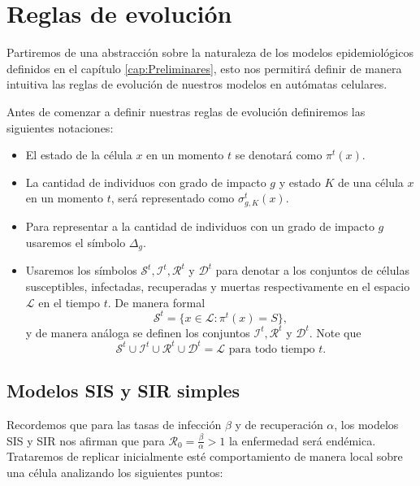 \section{Reglas de evolución}\label{sec:ReglasDeEvolución}

Partiremos de una abstracción sobre la naturaleza de los modelos epidemiológicos definidos en el capítulo \ref{cap:Preliminares}, esto nos permitirá definir de manera intuitiva las reglas de evolución de nuestros modelos en autómatas celulares.

Antes de comenzar a definir nuestras reglas de evolución definiremos las siguientes notaciones:
\begin{itemize}
    \item El estado de la célula $x$ en un momento $t$ se denotará como $\pi^t(x)$.
    \item La cantidad de individuos con grado de impacto $g$ y estado $K$ de una célula $x$ en un momento $t$, será representado como $\sigma_{g,K}^t(x)$.
    \item Para representar a la cantidad de individuos con un grado de impacto $g$ usaremos el símbolo $\Delta_g$. 
    \item Usaremos los símbolos $\mathcal{S}^t,\mathcal{I}^t,\mathcal{R}^t$ y $\mathcal{D}^t$ para denotar a los conjuntos de células susceptibles, infectadas, recuperadas y muertas respectivamente en el espacio $\mathcal{L}$ en el tiempo $t$. De manera formal
    $$\mathcal{S}^t=\{x\in\mathcal{L}:\pi^t(x)=S\},$$
    y de manera análoga se definen los conjuntos $\mathcal{I}^t,\mathcal{R}^t$ y $\mathcal{D}^t$. Note que $$\mathcal{S}^t\cup\mathcal{I}^t\cup\mathcal{R}^t\cup\mathcal{D}^t=\mathcal{L}\text{ para todo tiempo }t.$$
\end{itemize}

\subsection{Modelos SIS y SIR simples}\label{sub:SISySIRSimples}

Recordemos que para las tasas de infección $\beta$ y de recuperación $\alpha$, los modelos SIS y SIR nos afirman que para $\mathcal{R}_0=\frac{\beta}{\alpha}>1$ la enfermedad será endémica. Trataremos de replicar inicialmente esté comportamiento de manera local sobre una célula analizando los siguientes puntos:

